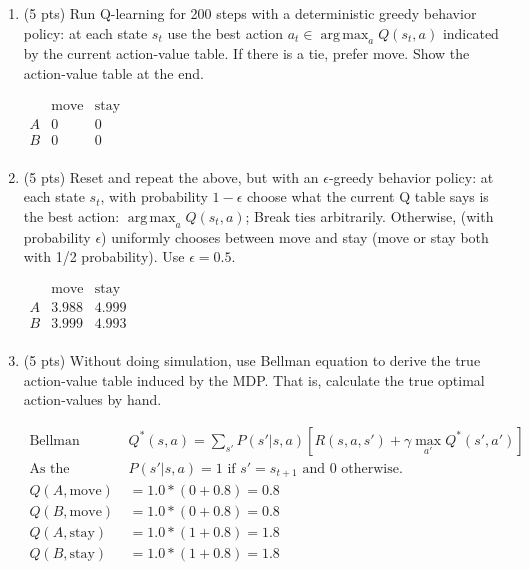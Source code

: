 \documentclass[a4paper]{article}
\theoremstyle{definition}
\DeclareMathOperator*{\argmax}{arg\,max}
\newenvironment{soln}{
    \leavevmode\color{blue}\ignorespaces
}{}
\begin{document}
\begin{enumerate}
\item (5 pts) Run Q-learning for 200 steps with a deterministic greedy behavior policy: at each state $s_t$ use the best action $a_t \in \argmax_a Q(s_t,a)$ indicated by the current action-value table. If there is a tie, prefer move. Show the action-value table at the end. \\
\begin{soln}
    $\begin{array}{c|cc}
        & \text{move} & \text{stay} \\
        \hline
        A & 0 & 0 \\
        B & 0 & 0 \\
    \end{array}$
        
\end{soln}


\item (5 pts) Reset and repeat the above, but with an $\epsilon$-greedy behavior policy: at each state $s_t$, with probability $1-\epsilon$ choose what the current Q table says is the best action: $\argmax_a Q(s_t,a)$; Break ties arbitrarily. Otherwise, (with probability $\epsilon$) uniformly chooses between move and stay (move or stay both with 1/2 probability). Use $\epsilon=0.5$. \\
\begin{soln}

    $\begin{array}{c|cc}
        & \text{move} & \text{stay} \\
        \hline
        A & 3.988 & 4.999 \\
        B & 3.999 & 4.993 \\
    \end{array}$

\end{soln}


\item (5 pts) Without doing simulation, use Bellman equation to derive the true action-value table induced by the MDP. That is, calculate the true optimal action-values by hand.

\begin{soln}
    \begin{align*}
        \text{Bellman Equation: } & Q^*(s, a) = \sum_{s'} P(s'|s, a) \left[ R(s, a, s') + \gamma \max_{a'} Q^*(s', a') \right] \\
        \text{As the transition is deterministic, } & P(s'|s, a) = 1 \text{ if } s' = s_{t+1} \text{ and } 0 \text{ otherwise.} \\
        Q(A, \text{move}) &= 1.0*(0 + 0.8) = 0.8 \\
        Q(B, \text{move}) &= 1.0*(0 + 0.8) = 0.8 \\
        Q(A, \text{stay}) &= 1.0*(1 + 0.8) = 1.8 \\
        Q(B, \text{stay}) &= 1.0*(1 + 0.8) = 1.8 \\
    \end{align*}
\end{soln}



\end{enumerate}
\end{document}
